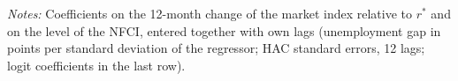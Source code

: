 \begin{table}[tbp]\centering\small
\caption{The Market Index and the NFCI Together}\label{tab:nfci}
\begin{flushleft}\footnotesize\textit{Notes:} Coefficients on the 12-month change of the market index relative to $r^*$ and on the level of the NFCI, entered together with own lags (unemployment gap in points per standard deviation of the regressor; HAC standard errors, 12 lags; logit coefficients in the last row).\end{flushleft}
\end{table}
